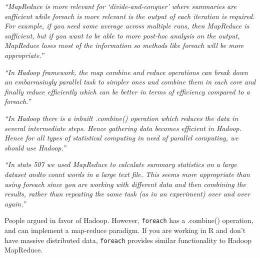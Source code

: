 \documentclass[12pt]{beamer}
\newcommand\ans[1]{{\it ``#1''}}
\newcommand\gap{\vspace{5mm}}
\begin{document}
\begin{frame}
  \ans{MapReduce is more relevant for `divide-and-conquer' where summaries are sufficient while foreach is more relevant is the output of each iteration is required. For example, if you need some average across multiple runs, then MapReduce is sufficient, but if you want to be able to more post-hoc analysis on the output, MapReduce loses most of the information so methods like foreach will be more appropriate.}
  
\end{frame}

\begin{frame}
  \ans{In  Hadoop  framework,  the  map  combine  and  reduce  operations  can  break  down  an embarrasingly parallel task to simpler ones and combine them in each core and finally reduce efficiently which can be better in terms of efficiency compared to a foreach.}

  \gap
  
\ans{In Hadoop there is a inbuilt .combine() operation which reduces the data in several intermediate steps.  Hence gathering data becomes efficient in Hadoop. Hence for all types of statistical computing in need of parallel computing, we should use Hadoop.}
  
\end{frame}

\begin{frame}
\ans{In stats 507 we used MapReduce to calculate summary statistics on a large dataset andto count words in a large text file.  This seems more appropriate than using foreach since you are working with different data and then combining the results, rather than repeating the same task (as in an experiment) over and over again.}
\end{frame}

\begin{frame}

  People argued in favor of Hadoop. However, \texttt{foreach} has a .combine() operation, and can implement a map-reduce paradigm. If you are working in R and don't have massive distributed data, \texttt{foreach} provides similar functionality to Hadoop MapReduce.

\end{frame}

  
\end{document}
